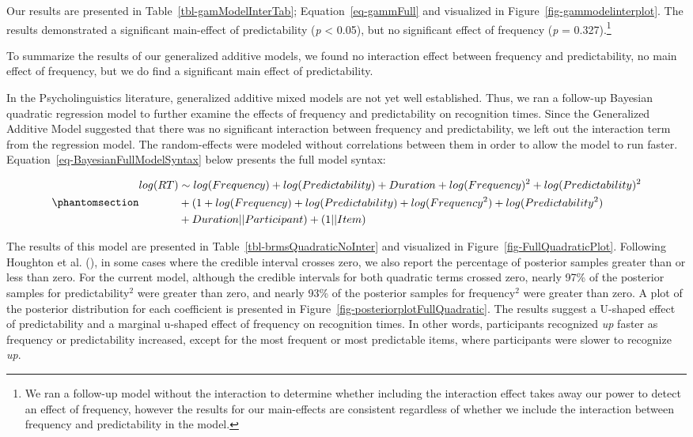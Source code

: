 \documentclass[
  12pt,
  letterpaper,
]{scrreprt}
\begin{document}
Our results are presented in Table~\ref{tbl-gamModelInterTab};
Equation~\ref{eq-gammFull} and visualized in
Figure~\ref{fig-gammodelinterplot}. The results demonstrated a
significant main-effect of predictability (\emph{p} \textless{} 0.05),
but no significant effect of frequency (\emph{p} = 0.327).\footnote{We
  ran a follow-up model without the interaction to determine whether
  including the interaction effect takes away our power to detect an
  effect of frequency, however the results for our main-effects are
  consistent regardless of whether we include the interaction between
  frequency and predictability in the model.}

To summarize the results of our generalized additive models, we found no
interaction effect between frequency and predictability, no main effect
of frequency, but we do find a significant main effect of
predictability.

In the Psycholinguistics literature, generalized additive mixed models
are not yet well established. Thus, we ran a follow-up Bayesian
quadratic regression model to further examine the effects of frequency
and predictability on recognition times. Since the Generalized Additive
Model suggested that there was no significant interaction between
frequency and predictability, we left out the interaction term from the
regression model. The random-effects were modeled without correlations
between them in order to allow the model to run faster.
Equation~\ref{eq-BayesianFullModelSyntax} below presents the full model
syntax:

\begin{equation}\phantomsection\label{eq-BayesianFullModelSyntax}{
\begin{aligned}
log(RT) & \sim  log(Frequency) + log(Predictability) + Duration + log(Frequency)^2  + log(Predictability)^2 \\ & + (1 + log(Frequency) + log(Predictability) + log(Frequency^2) + log(Predictability^2) \\& + Duration || Participant) + (1 || Item)
\end{aligned}
}\end{equation}

The results of this model are presented in
Table~\ref{tbl-brmsQuadraticNoInter} and visualized in
Figure~\ref{fig-FullQuadraticPlot}. Following Houghton et al.
(),
in some cases where the credible interval crosses zero, we also report
the percentage of posterior samples greater than or less than zero. For
the current model, although the credible intervals for both quadratic
terms crossed zero, nearly 97\% of the posterior samples for
predictability\(^2\) were greater than zero, and nearly 93\% of the
posterior samples for frequency\(^2\) were greater than zero. A plot of
the posterior distribution for each coefficient is presented in
Figure~\ref{fig-posteriorplotFullQuadratic}. The results suggest a
U-shaped effect of predictability and a marginal u-shaped effect of
frequency on recognition times. In other words, participants recognized
\emph{up} faster as frequency or predictability increased, except for
the most frequent or most predictable items, where participants were
slower to recognize \emph{up}.
\end{document}
